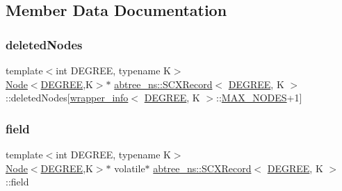 \subsection{Member Data Documentation}
\mbox{\label{structabtree__ns_1_1SCXRecord_ab66bafb4bde78a1e5e7fac9631fdce22}} 
\subsubsection{\texorpdfstring{deleted\+Nodes}{deletedNodes}}
{\footnotesize\ttfamily template$<$int D\+E\+G\+R\+EE, typename K$>$ \\
\hyperlink{structabtree__ns_1_1Node}{Node}$<$\hyperlink{brown__sigouin__abtree__kcas_2adapter_8h_a5d88b17d70c985f2f2b8e987037fd6dd}{D\+E\+G\+R\+EE},K$>$$\ast$ \hyperlink{structabtree__ns_1_1SCXRecord}{abtree\+\_\+ns\+::\+S\+C\+X\+Record}$<$ \hyperlink{brown__sigouin__abtree__kcas_2adapter_8h_a5d88b17d70c985f2f2b8e987037fd6dd}{D\+E\+G\+R\+EE}, K $>$\+::deleted\+Nodes\mbox{[}\hyperlink{classabtree__ns_1_1wrapper__info}{wrapper\+\_\+info}$<$ \hyperlink{brown__sigouin__abtree__kcas_2adapter_8h_a5d88b17d70c985f2f2b8e987037fd6dd}{D\+E\+G\+R\+EE}, K $>$\+::\hyperlink{scxrecord_8h_abd2aacdca9cb2a1a30f3392256b96ea3}{M\+A\+X\+\_\+\+N\+O\+D\+ES}+1\mbox{]}}

\mbox{\label{structabtree__ns_1_1SCXRecord_ab75f0b7eb40e69140e9e570a9b258692}} 
\subsubsection{\texorpdfstring{field}{field}}
{\footnotesize\ttfamily template$<$int D\+E\+G\+R\+EE, typename K$>$ \\
\hyperlink{structabtree__ns_1_1Node}{Node}$<$\hyperlink{brown__sigouin__abtree__kcas_2adapter_8h_a5d88b17d70c985f2f2b8e987037fd6dd}{D\+E\+G\+R\+EE},K$>$$\ast$ volatile$\ast$ \hyperlink{structabtree__ns_1_1SCXRecord}{abtree\+\_\+ns\+::\+S\+C\+X\+Record}$<$ \hyperlink{brown__sigouin__abtree__kcas_2adapter_8h_a5d88b17d70c985f2f2b8e987037fd6dd}{D\+E\+G\+R\+EE}, K $>$\+::field}


